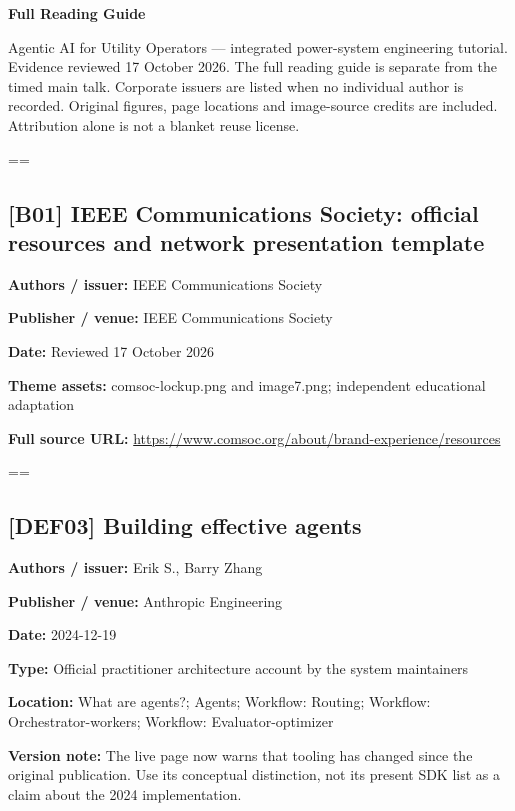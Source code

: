 \documentclass[10pt,letterpaper]{article}
\begin{document}
{\LARGE\bfseries Full Reading Guide}\par
Agentic AI for Utility Operators --- integrated power-system engineering tutorial. Evidence reviewed 17 October 2026. The full reading guide is separate from the timed main talk. Corporate issuers are listed when no individual author is recorded. Original figures, page locations and image-source credits are included. Attribution alone is not a blanket reuse license.\par
\setbox\readingEntry=\vbox\bgroup\hsize=\linewidth\subsection*{[B01] IEEE Communications Society: official resources and network presentation template}
\textbf{Authors / issuer:} IEEE Communications Society\par
\textbf{Publisher / venue:} IEEE Communications Society\par
\textbf{Date:} Reviewed 17 October 2026\par
\textbf{Theme assets:} comsoc-lockup.png and image7.png; independent educational adaptation\par
\textbf{Full source URL:} \href{https://www.comsoc.org/about/brand-experience/resources}{\small\ttfamily https:/\allowbreak{}/\allowbreak{}www.\allowbreak{}comsoc.\allowbreak{}org/\allowbreak{}about/\allowbreak{}brand-\allowbreak{}experience/\allowbreak{}resources}\par
\egroup\par\noindent\box\readingEntry\par\medskip
\setbox\readingEntry=\vbox\bgroup\hsize=\linewidth\subsection*{[DEF03] Building effective agents}
\textbf{Authors / issuer:} Erik S., Barry Zhang\par
\textbf{Publisher / venue:} Anthropic Engineering\par
\textbf{Date:} 2024-12-19\par
\textbf{Type:} Official practitioner architecture account by the system maintainers\par
\textbf{Location:} What are agents?; Agents; Workflow: Routing; Workflow: Orchestrator-workers; Workflow: Evaluator-optimizer\par
\textbf{Version note:} The live page now warns that tooling has changed since the original publication. Use its conceptual distinction, not its present SDK list as a claim about the 2024 implementation.\par
\end{document}
